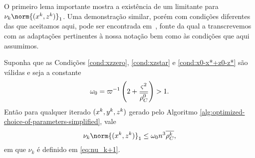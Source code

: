 
O primeiro lema importante mostra a existência de um limitante para $\nu_k\norm{(\xk,\zk)}_{1}$. Uma demonstração similar, porém com condições diferentes das que aceitamos aqui, pode ser encontrada em~\cite[Lema 6.1]{Wright:Primal-dual-interior-point:1997h}, fonte da qual a transcrevemos com as adaptações pertinentes à nossa notação bem como às condições que aqui assumimos.




\begin{lema}\label{lemma:boundxz1}
	Suponha que as Condições \ref{cond:xzzero}, \ref{cond:xzstar} e \ref{cond:x0-x*+z0-z*} são válidas e seja a constante 
	\begin{equation}\label{eq:omega-0}
		\omega_{0} = \varpi^{-1}\left(2  + \dfrac{\varsigma^{2}}{\overline{\rho_C^{0}}}\right) >1.
		\end{equation} 
	 Então para qualquer iterado $(x^{k},y^{k},z^{k})$ gerado pelo Algoritmo \ref{alg:optimized-choice-of-parameters-simplified}, vale
	\begin{equation}
		\label{eq:bound-xkzk}
		\nu_k\norm{(\xk,\zk)}_{1} \leq  \omega_{0} n^{3} \dbvec{\rho_C^{k}},
	\end{equation}
	em que $\nu_k$ é definido em \eqref{eq:nu_k+1}.
\end{lema}

